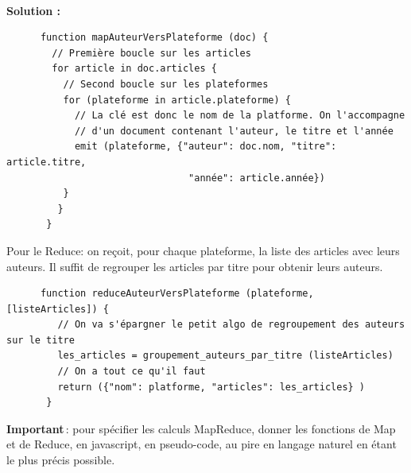 \documentclass[11pt,a4paper]{article}
\newenvironment{solution}[0]{
~\\ \color{red} \textbf{Solution : }\color{black}}{%
}
\begin{document}
\begin{enumerate}
\begin{solution}
    \begin{small}
    \begin{verbatim}
      function mapAuteurVersPlateforme (doc) {
        // Première boucle sur les articles
        for article in doc.articles {
          // Second boucle sur les plateformes
          for (plateforme in article.plateforme) {
            // La clé est donc le nom de la platforme. On l'accompagne
            // d'un document contenant l'auteur, le titre et l'année
            emit (plateforme, {"auteur": doc.nom, "titre": article.titre, 
                                "année": article.année})
          }
         } 
       }
    \end{verbatim}
    \end{small}
    
    Pour le Reduce: on reçoit, pour chaque plateforme, la liste des articles avec leurs auteurs. 
    Il suffit de regrouper les articles par titre pour obtenir leurs auteurs.
    
        \begin{small}
    \begin{verbatim}
      function reduceAuteurVersPlateforme (plateforme, [listeArticles]) {
         // On va s'épargner le petit algo de regroupement des auteurs sur le titre
         les_articles = groupement_auteurs_par_titre (listeArticles)
         // On a tout ce qu'il faut
         return ({"nom": platforme, "articles": les_articles} )
       }
    \end{verbatim}
    \end{small}
    
\end{solution}


   \textbf{Important}\,: pour spécifier les calculs MapReduce, donner les fonctions de Map et de Reduce, en javascript,
en pseudo-code, au pire en langage naturel en étant le plus précis possible. 
   


\end{enumerate}
\end{document}
